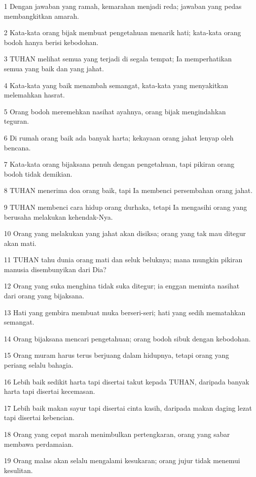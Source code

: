 \par 1 Dengan jawaban yang ramah, kemarahan menjadi reda; jawaban yang pedas membangkitkan amarah.
\par 2 Kata-kata orang bijak membuat pengetahuan menarik hati; kata-kata orang bodoh hanya berisi kebodohan.
\par 3 TUHAN melihat semua yang terjadi di segala tempat; Ia memperhatikan semua yang baik dan yang jahat.
\par 4 Kata-kata yang baik menambah semangat, kata-kata yang menyakitkan melemahkan hasrat.
\par 5 Orang bodoh meremehkan nasihat ayahnya, orang bijak mengindahkan teguran.
\par 6 Di rumah orang baik ada banyak harta; kekayaan orang jahat lenyap oleh bencana.
\par 7 Kata-kata orang bijaksana penuh dengan pengetahuan, tapi pikiran orang bodoh tidak demikian.
\par 8 TUHAN menerima doa orang baik, tapi Ia membenci persembahan orang jahat.
\par 9 TUHAN membenci cara hidup orang durhaka, tetapi Ia mengasihi orang yang berusaha melakukan kehendak-Nya.
\par 10 Orang yang melakukan yang jahat akan disiksa; orang yang tak mau ditegur akan mati.
\par 11 TUHAN tahu dunia orang mati dan seluk beluknya; mana mungkin pikiran manusia disembunyikan dari Dia?
\par 12 Orang yang suka menghina tidak suka ditegur; ia enggan meminta nasihat dari orang yang bijaksana.
\par 13 Hati yang gembira membuat muka berseri-seri; hati yang sedih mematahkan semangat.
\par 14 Orang bijaksana mencari pengetahuan; orang bodoh sibuk dengan kebodohan.
\par 15 Orang muram harus terus berjuang dalam hidupnya, tetapi orang yang periang selalu bahagia.
\par 16 Lebih baik sedikit harta tapi disertai takut kepada TUHAN, daripada banyak harta tapi disertai kecemasan.
\par 17 Lebih baik makan sayur tapi disertai cinta kasih, daripada makan daging lezat tapi disertai kebencian.
\par 18 Orang yang cepat marah menimbulkan pertengkaran, orang yang sabar membawa perdamaian.
\par 19 Orang malas akan selalu mengalami kesukaran; orang jujur tidak menemui kesulitan.
